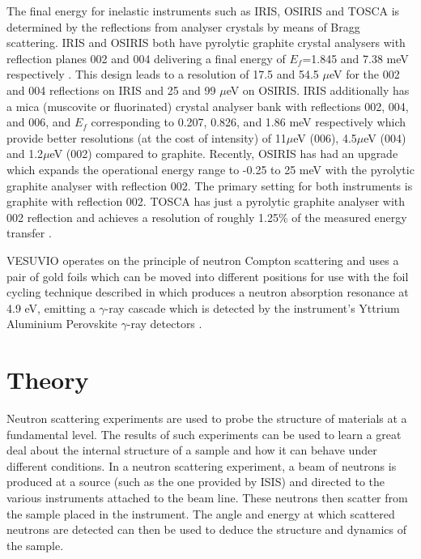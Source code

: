 \documentclass[paper=a4, fontsize=11pt]{scrartcl}	%
\numberwithin{equation}{section}															%
\numberwithin{figure}{section}																%
\numberwithin{table}{section}																%
\begin{document}
The final energy for inelastic instruments such as IRIS, OSIRIS and TOSCA is determined by the reflections from analyser crystals by means of Bragg scattering. IRIS and OSIRIS both have pyrolytic graphite crystal analysers with reflection planes 002 and 004 delivering a final energy of $E_f$=1.845 and 7.38 meV respectively \cite{adams2001iris}\cite{telling2008osiris}. This design leads to a resolution of 17.5 and 54.5 $\mu$eV for the 002 and 004 reflections on IRIS and 25 and 99 $\mu$eV on OSIRIS. IRIS additionally has a mica (muscovite or fluorinated) crystal analyser bank with reflections 002, 004, and 006, and $E_f$ corresponding to 0.207, 0.826, and 1.86 meV respectively which provide better resolutions (at the cost of intensity) of 11$\mu$eV (006), 4.5$\mu$eV (004) and
1.2$\mu$eV (002) compared to graphite. Recently, OSIRIS has had an upgrade which expands the operational energy range to -0.25 to 25 meV with the pyrolytic graphite analyser with reflection 002. The primary setting for both instruments is graphite with reflection 002. TOSCA has just a pyrolytic graphite analyser with 002 reflection \cite{colognesi2002tosca} and achieves a resolution of roughly 1.25\% of the measured energy transfer \cite{parker2003tosca}.

VESUVIO operates on the principle of neutron Compton scattering and uses a pair of gold foils which can be moved into different positions for use with the foil cycling technique described in \cite{schooneveld2006foil} which produces a neutron absorption resonance at 4.9 eV, emitting a $\gamma$-ray cascade which is detected by the instrument's Yttrium Aluminium Perovskite $\gamma$-ray detectors \cite{mayers2010user}.

\section{Theory}
Neutron scattering experiments are used to probe the structure of materials at a fundamental level. The results of such experiments can be used to learn a great deal about the internal structure of a sample and how it can behave under different conditions. In a neutron scattering experiment, a beam of neutrons is produced at a source (such as the one provided by ISIS) and directed to the various instruments attached to the beam line. These neutrons then scatter from the sample placed in the instrument. The angle and energy at which scattered neutrons are detected can then be used to deduce the structure and dynamics of the sample.
\end{document}
